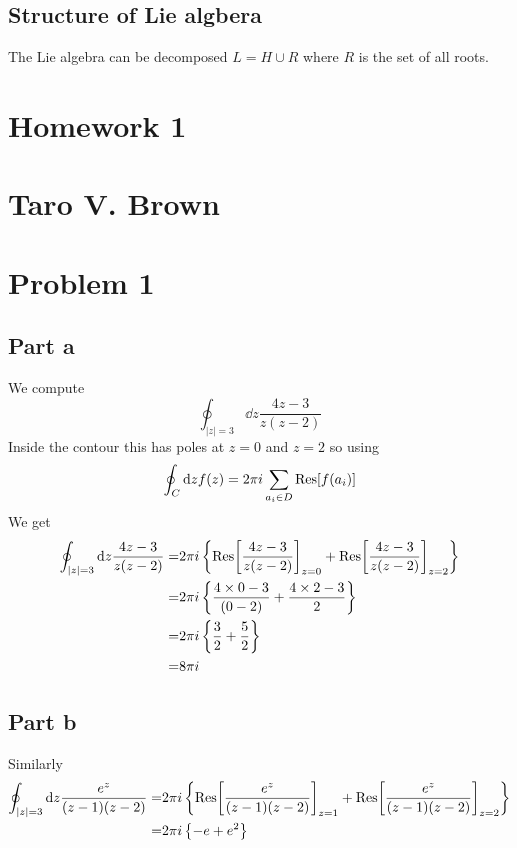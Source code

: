 \documentclass[a4paper,12pt]{article}
\begin{document}
\subsection{Structure of Lie algbera}
The Lie algebra can be decomposed $L=H\cup R$ where $R$ is the set of all roots.
\newpage
\section*{Homework 1\\\\
Taro V. Brown}\vspace*{1cm}
\section*{Problem 1}
\subsection*{Part a}
We compute
\begin{equation}
\oint_{|z|=3} \dd z\frac{4z-3}{z(z-2)}
\end{equation}
Inside the contour this has poles at $z=0$ and $z=2$ so using 
\begin{equation}
	\oint _C \dd z  f(z)=2\pi i \sum_{a_i\in D}\Res[f(a_i)]
\end{equation}
We get
\begin{equation}
\begin{aligned}
	\oint_{|z|=3} \dd z\frac{4z-3}{z(z-2)}=&2\pi i \left\{\Res[\frac{4z-3}{z(z-2)}]_{z=0}+\Res[\frac{4z-3}{z(z-2)}]_{z=2}\right\}\\
	=&2\pi i \left\{\frac{4\times 0-3}{(0-2)}+\frac{4\times 2-3}{2}\right\}\\
	=&2\pi i \left\{\frac{3}{2}+\frac{5}{2}\right\}\\	
	=&8\pi i 
\end{aligned}
\end{equation}
\subsection*{Part b}
Similarly
\begin{equation}
	\begin{aligned}
		\oint_{|z|=3} \dd z\frac{e^z}{(z-1)(z-2)}=&2\pi i \left\{\Res[\frac{e^z}{(z-1)(z-2)}]_{z=1}+\Res[\frac{e^z}{(z-1)(z-2)}]_{z=2}\right\}\\
		=&2\pi i \left\{-e+e^2\right\}\\
	\end{aligned}
\end{equation}
\end{document}
